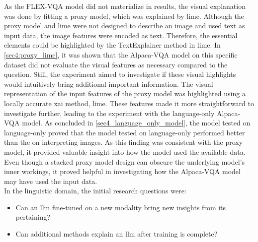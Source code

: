 As the FLEX-VQA model did not materialize in results, the visual explanation was done by fitting a proxy model, which was explained by \gls{lime}. Although the proxy model and \gls{lime} were not designed to describe an image and used text as input data, the image features were encoded as text. Therefore, the essential elements could be highlighted by the TextExplainer method in \gls{lime}. In \autoref{sec4:proxy_lime}, it was shown that the Alpaca-VQA model on this specific dataset did not evaluate the visual features as necessary compared to the question. Still, the experiment aimed to investigate if these visual highlights would intuitively bring additional important information. The visual representation of the input features of the proxy model was highlighted using a locally accurate \gls{xai} method, \gls{lime}. These features made it more straightforward to investigate further, leading to the experiment with the language-only Alpaca-VQA model. As concluded in \autoref{sec4_language_only_model}, the model tested on language-only proved that the model tested on language-only performed better than the on interpreting images. As this finding was consistent with the proxy model, it provided valuable insight into how the model used the available data. 
Even though a stacked proxy model design can obscure the underlying model's inner workings, it proved helpful in investigating how the Alpaca-VQA model may have used the input data.\\


In the linguistic domain, the initial research questions were:
\begin{itemize}
    \item Can an \gls{llm} fine-tuned on a new modality bring new insights from its pertaining?

    \item Can additional methods explain an \gls{llm} after training is complete?
\end{itemize}

